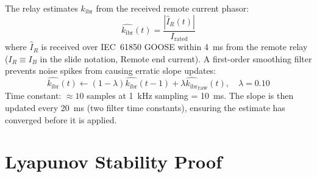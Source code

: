 \documentclass[12pt,a4paper]{article}
\newcommand{\kibr}{k_\mathrm{ibr}}
\begin{document}
The relay estimates $\kibr$ from the received remote current phasor:
\begin{equation}
  \hat{\kibr}(t) = \frac{|\hat{I}_R(t)|}{I_\mathrm{rated}}
  \label{eq:kibr_est}
\end{equation}
where $\hat{I}_R$ is received over IEC~61850 GOOSE within 4~ms from the remote relay ($I_R \equiv I_B$ in the slide notation, Remote end current). A first-order smoothing filter prevents noise spikes from causing erratic slope updates:
\begin{equation}
  \hat{\kibr}(t) \leftarrow (1-\lambda)\hat{\kibr}(t-1) + \lambda\hat{\kibr}_\mathrm{raw}(t), \quad \lambda = 0.10
  \label{eq:kibr_filter}
\end{equation}
Time constant: $\approx 10$ samples at 1~kHz sampling = 10~ms. The slope is then updated every 20~ms (two filter time constants), ensuring the estimate has converged before it is applied.

\section{Lyapunov Stability Proof}
\end{document}
